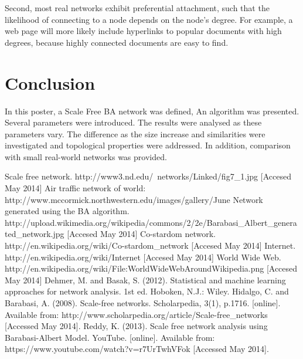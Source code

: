 \documentclass[a0,final]{a0poster}
\begin{document}
\begin{multicols}{3}
Second, most real networks exhibit preferential attachment, such that the likelihood of connecting to a node depends on the node’s degree. For example, a web page will more likely include hyperlinks to popular documents with high degrees, because highly connected documents are easy to find. 




\section*{Conclusion}
In this poster, a Scale Free BA network was defined, An algorithm was presented. Several parameters were introduced. The results were analysed as these parameters vary. The difference as the size increase and similarities were investigated and topological properties were addressed. In addition, comparison with small real-world networks was provided. 


\begin{bibliography}{9}

 Scale free network. http://www3.nd.edu/~networks/Linked/fig7_1.jpg [Accesed May 2014]
 Air traffic network of world: http://www.mccormick.northwestern.edu/images/gallery/June%
 Network generated using the BA algorithm. http://upload.wikimedia.org/wikipedia/commons/2/2e/Barabasi_Albert_generated_network.jpg [Accesed May 2014]
 Co-stardom network. http://en.wikipedia.org/wiki/Co-stardom_network [Accesed May 2014]
 Internet. http://en.wikipedia.org/wiki/Internet [Accesed May 2014]
 World Wide Web. http://en.wikipedia.org/wiki/File:WorldWideWebAroundWikipedia.png [Accesed May 2014]
 Dehmer, M. and Basak, S. (2012). Statistical and machine learning approaches for network analysis. 1st ed. Hoboken, N.J.: Wiley.
 Hidalgo, C. and Barabasi, A. (2008). Scale-free networks. Scholarpedia, 3(1), p.1716. [online]. Available from: http://www.scholarpedia.org/article/Scale-free_networks [Accessed May 2014].
 Reddy, K. (2013). Scale free network analysis using Barabasi-Albert Model. YouTube. [online]. Available from: https://www.youtube.com/watch?v=r7UrTwhVFok [Accessed May 2014].

\end{bibliography}

\end{multicols}
\end{document}
